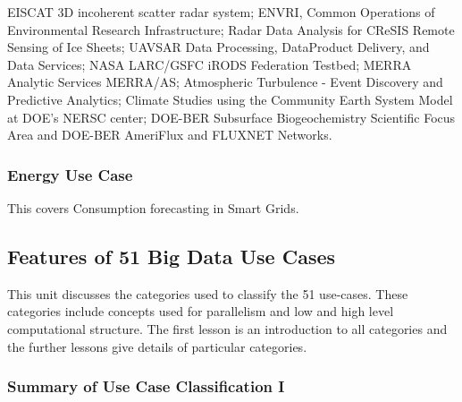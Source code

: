 EISCAT 3D incoherent scatter radar system; ENVRI, Common Operations of
Environmental Research Infrastructure; Radar Data Analysis for CReSIS
Remote Sensing of Ice Sheets; UAVSAR Data Processing, DataProduct
Delivery, and Data Services; NASA LARC/GSFC iRODS Federation Testbed;
MERRA Analytic Services MERRA/AS; Atmospheric Turbulence - Event
Discovery and Predictive Analytics; Climate Studies using the Community
Earth System Model at DOE's NERSC center; DOE-BER Subsurface
Biogeochemistry Scientific Focus Area and DOE-BER AmeriFlux and FLUXNET
Networks.





\subsubsection{Energy Use Case}\label{energy-use-case}

This covers Consumption forecasting in Smart Grids.





\subsection{Features of 51 Big Data Use
Cases}\label{features-of-51-big-data-use-cases}

This unit discusses the categories used to classify the 51 use-cases.
These categories include concepts used for parallelism and low and high
level computational structure. The first lesson is an introduction to
all categories and the further lessons give details of particular
categories.




\subsubsection{Summary of Use Case Classification
I}\label{summary-of-use-case-classification-i}


